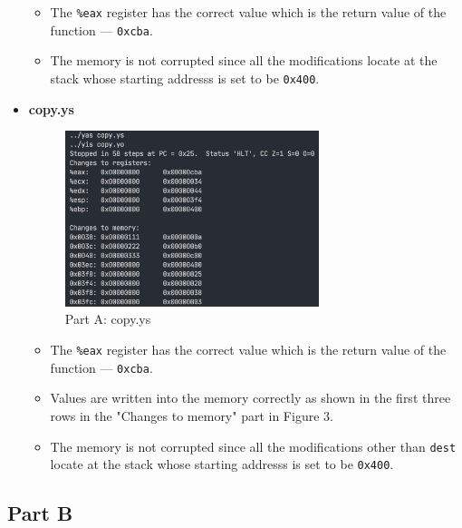 \documentclass[12pt,a4paper]{article}
\begin{document}
\begin{itemize}
\begin{itemize}
        \item The \texttt{\%eax} register has the correct value which is the return value of the function --- \texttt{0xcba}.
        \item The memory is not corrupted since all the modifications locate at the stack whose starting addresss is set to be \texttt{0x400}.
\end{itemize}

	\item \textbf{copy.ys}\\

\begin{figure}[H] %
        \centering %
        \includegraphics[width=0.7\textwidth]{partA-copy-bz.png} %
        \caption{Part A: copy.ys} %
        \label{Fig.partA-copy} %
\end{figure}

\begin{itemize}
        \item The \texttt{\%eax} register has the correct value which is the return value of the function --- \texttt{0xcba}.
        \item Values are written into the memory correctly as shown in the first three rows in the "Changes to memory" part in Figure 3.
        \item The memory is not corrupted since all the modifications other than \texttt{dest} locate at the stack whose starting addresss is set to be \texttt{0x400}.
\end{itemize}
\end{itemize}
\pagebreak
\subsection{Part B}
\end{document}
